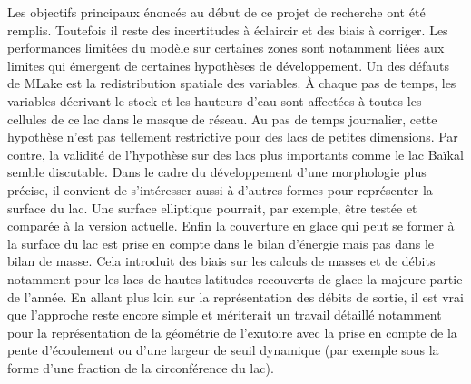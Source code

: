 Les objectifs principaux énoncés au début de ce projet de recherche ont été remplis. Toutefois il reste des incertitudes à éclaircir et des biais à corriger. Les performances limitées du modèle sur certaines zones sont notamment liées aux limites qui émergent de certaines hypothèses de développement. Un des défauts de MLake est la redistribution spatiale des variables. À chaque pas de temps, les variables décrivant le stock et les hauteurs d'eau sont affectées à toutes les cellules de ce lac dans le masque de réseau. Au pas de temps journalier, cette hypothèse n'est pas tellement restrictive pour des lacs de petites dimensions. Par contre, la validité de l'hypothèse sur des lacs plus importants comme le lac Baïkal semble discutable. Dans le cadre du développement d'une morphologie plus précise, il convient de s'intéresser aussi à d'autres formes pour représenter la surface du lac. Une surface elliptique pourrait, par exemple, être testée et comparée à la version actuelle. Enfin la couverture en glace qui peut se former à la surface du lac est prise en compte dans le bilan d'énergie mais pas dans le bilan de masse. Cela introduit des biais sur les calculs de masses et de débits notamment pour les lacs de hautes latitudes recouverts de glace la majeure partie de l'année. En allant plus loin sur la représentation des débits de sortie, il est vrai que l'approche reste encore simple et mériterait un travail détaillé notamment pour la représentation de la géométrie de l'exutoire avec la prise en compte de la pente d'écoulement ou d'une largeur de seuil dynamique (par exemple sous la forme d'une fraction de la circonférence du lac).\\

